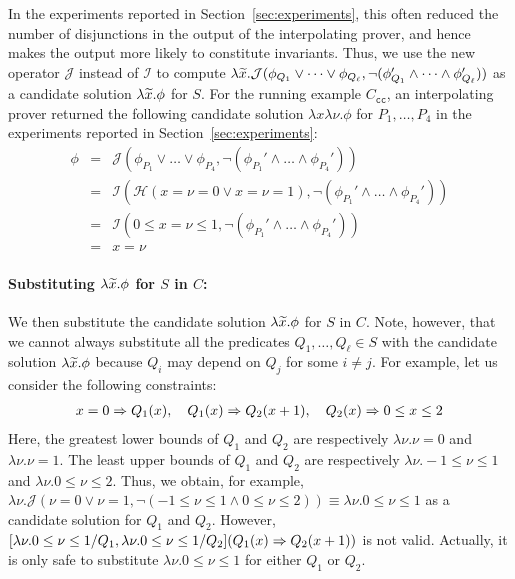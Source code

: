 In the experiments reported in Section~\ref{sec:experiments}, this often
reduced the number of disjunctions in the output of the interpolating
prover, and hence makes the output more likely to constitute invariants.
%
Thus, we use the new operator \(\mathcal{J}\) instead of \(\mathcal{I}\) 
to compute \(\lambda\widetilde{x}.\mathcal{J}(\phi_{Q_1} \lor \dots\lor 
\phi_{Q_{\ell}},\neg (\phi_{Q_1}' \land \dots \land\phi_{Q_{\ell}}'))\) 
as a candidate solution \(\lambda \widetilde{x}. \phi\) for \(S\).  For the 
running example \(C_{\texttt{cc}}\), an interpolating prover returned 
the following candidate solution \(\lambda x \lambda \nu.\phi\) for 
\(P_1,\dots,P_4\) in the experiments reported in 
Section~\ref{sec:experiments}:
\[
\begin{array}{rcl}
\phi&=& \mathcal{J}(\phi_{P_1} \lor \dots \lor \phi_{P_4},\neg (\phi_{P_1}' \land \dots \land \phi_{P_4}')) \\
&=& \mathcal{I}(\mathcal{H}(x=\nu=0 \lor x=\nu=1),\neg (\phi_{P_1}' \land \dots \land \phi_{P_4}')) \\
&=& \mathcal{I}(0 \leq x=\nu \leq 1,\neg (\phi_{P_1}' \land \dots \land \phi_{P_4}')) \\
&=& x=\nu
\end{array}
\]

\paragraph{Substituting \(\lambda \widetilde{x}.\phi\) for \(S\) in \(C\):}
We then substitute the candidate solution \(\lambda \widetilde{x}.\phi\) for 
\(S\) in \(C\).  Note, however, that we cannot always substitute all the 
predicates \(Q_1,\dots,Q_{\ell} \in S\) with the candidate solution 
\(\lambda\widetilde{x}.\phi\) because \(Q_i\) may depend on \(Q_j\) for some 
\(i \neq j\).  For example, let us consider the following constraints:
\begin{eqnarray*}
x=0 \Rightarrow Q_1(x), \quad
Q_1(x) \Rightarrow Q_2(x+1), \quad
Q_2(x) \Rightarrow 0 \leq x \leq 2
\end{eqnarray*}
Here, the greatest lower bounds of \(Q_1\) and \(Q_2\) are respectively 
\(\lambda \nu.\nu=0\) and \(\lambda \nu.\nu=1\).  The least upper bounds 
of \(Q_1\) and \(Q_2\) are respectively \(\lambda \nu.-1 \leq \nu\leq 1\) 
and \(\lambda \nu.0 \leq \nu \leq 2\).  Thus, we obtain, for example, 
\(\lambda \nu.\mathcal{J}(\nu=0 \lor \nu=1,\neg (-1 \leq \nu\leq 1 \land 
0 \leq \nu \leq 2)) \equiv \lambda \nu.0 \leq \nu \leq 1\) as a 
candidate solution for \(Q_1\) and \(Q_2\).  However, \([\lambda\nu.0 
\leq \nu \leq 1/Q_1,\lambda \nu.0 \leq \nu \leq 1/Q_2](Q_1(x) \Rightarrow 
Q_2(x+1))\) is not valid.  Actually, it is only safe to substitute 
\(\lambda \nu.0 \leq \nu\leq 1\) for either \(Q_1\) or \(Q_2\).

